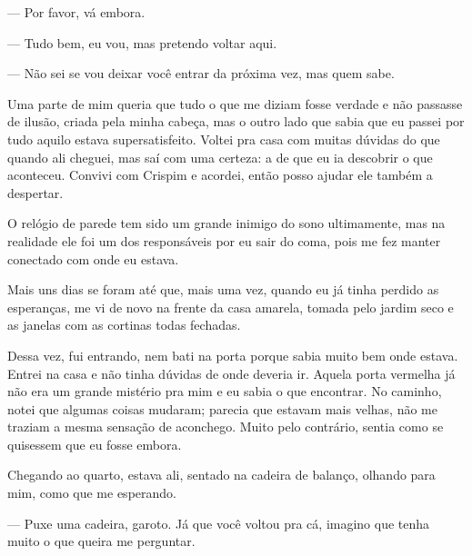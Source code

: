 — Por favor, vá embora.

— Tudo bem, eu vou, mas pretendo voltar aqui.

— Não sei se vou deixar você entrar da próxima vez, mas quem sabe.

Uma parte de mim queria que tudo o que me diziam fosse verdade e não passasse de ilusão, criada pela minha cabeça, mas o outro lado que sabia que eu passei por tudo aquilo estava supersatisfeito. Voltei pra casa com muitas dúvidas do que quando ali cheguei, mas saí com uma certeza: a de que eu ia descobrir o que aconteceu. Convivi com Crispim e acordei, então posso ajudar ele também a despertar.

O relógio de parede tem sido um grande inimigo do sono ultimamente, mas na realidade ele foi um dos responsáveis por eu sair do coma, pois me fez manter conectado com onde eu estava.

Mais uns dias se foram até que, mais uma vez, quando eu já tinha perdido as esperanças, me vi de novo na frente da casa amarela, tomada pelo jardim seco e as janelas com as cortinas todas fechadas.

Dessa vez, fui entrando, nem bati na porta porque sabia muito bem onde estava. Entrei na casa e não tinha dúvidas de onde deveria ir. Aquela porta vermelha já não era um grande mistério pra mim e eu sabia o que encontrar. No caminho, notei que algumas coisas mudaram; parecia que estavam mais velhas, não me traziam a mesma sensação de aconchego. Muito pelo contrário, sentia como se quisessem que eu fosse embora.

Chegando ao quarto, estava ali, sentado na cadeira de balanço, olhando para mim, como que me esperando.

— Puxe uma cadeira, garoto. Já que você voltou pra cá, imagino que tenha muito o que queira me perguntar.
